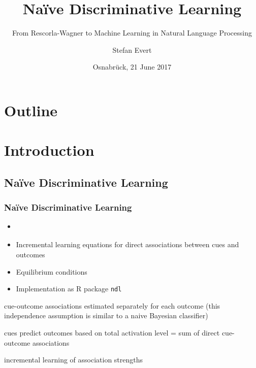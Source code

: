 \documentclass[t]{beamer} %
\title[NDL: From R-W to ML in NLP]{Naïve Discriminative Learning}
\subtitle{From Rescorla-Wagner to Machine Learning in Natural Language Processing}
\author{Stefan Evert}
\institute[]{%
  Friedrich-Alexander-Universität Erlangen-Nürnberg, Germany\\
  {\secondary{\url{stefan.evert@fau.de}}}
}
\date[Osnabrück, 21.06.2017]{Osnabrück, 21 June 2017}
\begin{document}
\frame{\titlepage}
\hideLogo


\section*{Outline}

\section{Introduction}

\subsection{Naïve Discriminative Learning}

\begin{frame}
  \frametitle{Naïve Discriminative Learning}
  
  \begin{itemize}
  \item \citet{Baayen:11,Baayen:etc:11}
  \item Incremental learning equations for direct associations between cues and outcomes \citep{Rescorla:Wagner:72} 
  \item Equilibrium conditions \citep{Danks:03}
  \item Implementation as R package \texttt{ndl} \citep{Arppe:etc:14}
  \end{itemize}
  
  \gap[1]
  \begin{description}[Discriminative:]
   \item[Naive:] cue-outcome associations estimated separately for
    each outcome (this independence assumption is similar to
    a naive Bayesian classifier)
  \item[Discriminative:] cues predict outcomes based on total activation level
    = sum of direct cue-outcome associations
  \item[Learning:] incremental learning of association strengths
  \end{description}
\end{frame}
\end{document}
